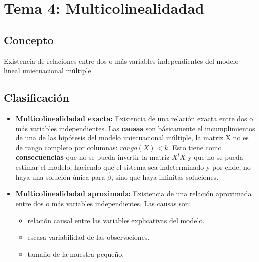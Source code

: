 \documentclass[a4paper,12pt]{article}
\newcommand{\ecuacion}[1]{\ensuremath{#1}}
\begin{document}
\section{Tema 4: Multicolinealidadad}

\subsection{Concepto}

Existencia de relaciones entre dos o más variables independientes del modelo lineal uniecuacional múltiple.

\subsection{Clasificación}

\begin{itemize}
    \item \textbf{Multicolinealidadad exacta: }Existencia de una relación exacta entre dos o más variables independientes. Las \textbf{causas} son básicamente el incumplimientos de una de las hipótesis del modelo uniecuacional múltiple, la matriz X no es de rango completo por columnas: \ecuacion{rango(X) < k}. Esto tiene como \textbf{consecuencias} que no se pueda invertir la matriz \ecuacion{X^tX} y que no se pueda estimar el modelo, haciendo que el sistema sea indeterminado y por ende, no haya una solución única para \ecuacion{\hat{\beta}}, sino que haya infinitas soluciones.
    \item \textbf{Multicolinealidadad aproximada: }Existencia de una relación aproximada entre dos o más variables independientes. Las causas son:
    \begin{itemize}
        \item relación causal entre las variables explicativas del modelo.
        \item escasa variabilidad de las observaciones.
        \item tamaño de la muestra pequeño.
    \end{itemize}

\end{itemize}
\end{document}

